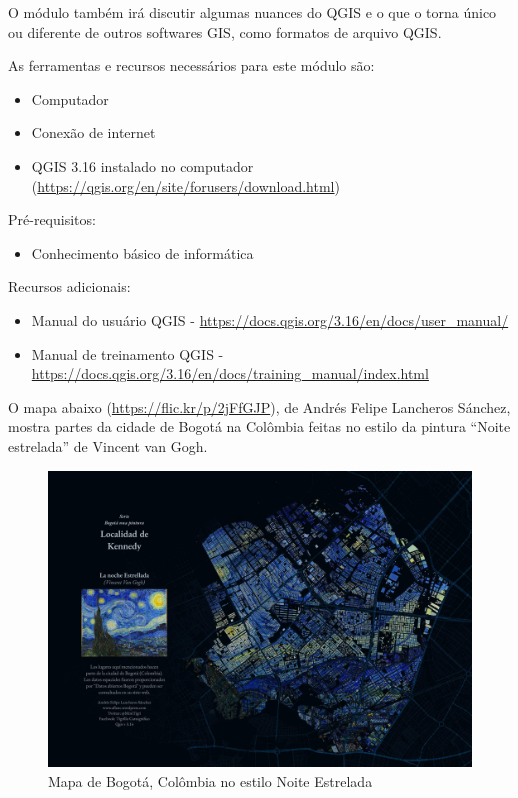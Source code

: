 \documentclass[
]{krantz}
\providecommand{\tightlist}{%
  \setlength{\itemsep}{0pt}\setlength{\parskip}{0pt}}
\begin{document}
O módulo também irá discutir algumas nuances do QGIS e o que o torna único ou diferente de outros softwares GIS, como formatos de arquivo QGIS.

As ferramentas e recursos necessários para este módulo são:

\begin{itemize}
\tightlist
\item
  Computador
\item
  Conexão de internet
\item
  QGIS 3.16 instalado no computador (\url{https://qgis.org/en/site/forusers/download.html})
\end{itemize}

Pré-requisitos:

\begin{itemize}
\tightlist
\item
  Conhecimento básico de informática
\end{itemize}

Recursos adicionais:

\begin{itemize}
\tightlist
\item
  Manual do usuário QGIS - \url{https://docs.qgis.org/3.16/en/docs/user_manual/}
\item
  Manual de treinamento QGIS - \url{https://docs.qgis.org/3.16/en/docs/training_manual/index.html}
\end{itemize}

O mapa abaixo (\url{https://flic.kr/p/2jFfGJP}), de Andrés Felipe Lancheros Sánchez, mostra partes da cidade de Bogotá na Colômbia feitas no estilo da pintura ``Noite estrelada'' de Vincent van Gogh.

\begin{figure}
\centering
\includegraphics{media/modulo1/sample-1.jpg}
\caption{Mapa de Bogotá, Colômbia no estilo Noite Estrelada}
\end{figure}
\end{document}
